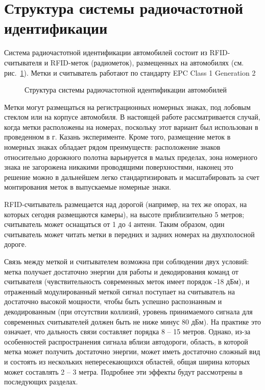 \section{Структура системы радиочастотной идентификации} \label{sec:ch2_structure}
Система радиочастотной идентификации автомобилей состоит из RFID-считывателя и RFID-меток (радиометок), размещенных на автомобилях (см. рис.~\ref{fig:ch2_system_structure}). Метки и считыватель работают по стандарту EPC Class 1 Generation 2 \cite{StdGen2}

\begin{figure}[ht]
  \caption{Структура системы радиочастотной идентификации автомобилей}
  \label{fig:ch2_system_structure}
\end{figure}

Метки могут размещаться на регистрационных номерных знаках, под лобовым стеклом или на корпусе автомобиля. В настоящей работе рассматривается случай, когда метки расположены на номерах, поскольку этот вариант был использован в проведенном в г. Казань эксперименте. Кроме того, размещение меток в номерных знаках обладает рядом преимуществ: расположение знаков относительно дорожного полотна варьируется в малых пределах, зона номерного знака не загорожена никакими проводящими поверхностями, наконец это решение можно в дальнейшем легко стандартизировать и масштабировать за счет монтирования меток в выпускаемые номерные знаки.

RFID-считыватель размещается над дорогой (например, на тех же опорах, на которых сегодня размещаются камеры), на высоте приблизительно 5 метров; считыватель может оснащаться от 1 до 4 антенн. Таким образом, один считыватель может читать метки в передних и задних номерах на двухполосной дороге.

Связь между меткой и считывателем возможна при соблюдении двух условий: метка получает достаточно энергии для работы и декодирования команд от считывателя (чувствительность современных меток имеет порядок -18 дБм), и отраженный модулированный меткой сигнал поступает на считыватель на достаточно высокой мощности, чтобы быть успешно распознанным и декодированным (при отсутствии коллизий, уровень принимаемого сигнала для современных считывателей должен быть не ниже минус 80 дБм). На практике это означает, что дальность связи составляет порядка 8 -- 15 метров. Однако, из-за особенностей распространения сигнала вблизи автодороги, область, в которой метка может получить достаточно энергии, может иметь достаточно сложный вид и состоять из нескольких непересекающихся областей, общая ширина которых может составлять 2 -- 3 метра. Подробнее эти эффекты будут рассмотрены в последующих разделах.



